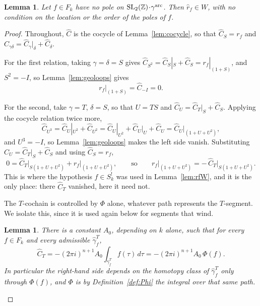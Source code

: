 \documentclass[11pt]{article}
\newtheorem{lemma}[theorem]{Lemma}
\newcommand{\ZZ}{\mathbb{Z}}
\newcommand{\SLZ}{\mathrm{SL}_2(\ZZ)}
\begin{document}
\begin{lemma}\label{lem:arcoff}
Let $f\in F_k$ have no pole on $\SLZ\!\cdot\!\gamma^{\rm arc}$. Then $\hat r_f\in W$, with no
condition on the location or the order of the poles of $f$.
\end{lemma}

\begin{proof}
Throughout, $\hat C$ is the cocycle of Lemma~\ref{lem:cocycle}, so that $\hat C_S=r_f$ and
$\hat C_{\gamma\delta}=\hat C_\gamma|_\delta+\hat C_\delta$.

For the first relation, taking $\gamma=\delta=S$ gives
$\hat C_{S^2}=\hat C_S|_S+\hat C_S=r_f|_{(1+S)}$, and $S^2=-I$, so
Lemma~\ref{lem:geoloops} gives
\begin{equation}\label{eq:arcoffS}
r_f\big|_{(1+S)}=\hat C_{-I}=0 .
\end{equation}

For the second, take $\gamma=T$, $\delta=S$, so that $U=TS$ and
$\hat C_U=\hat C_T|_S+\hat C_S$. Applying the cocycle relation twice more,
\begin{equation*}
\hat C_{U^3}=\hat C_U|_{U^2}+\hat C_{U^2}
=\hat C_U|_{U^2}+\hat C_U|_{U}+\hat C_U=\hat C_U\big|_{(1+U+U^2)} ,
\end{equation*}
and $U^3=-I$, so Lemma~\ref{lem:geoloops} makes the left side vanish. Substituting
$\hat C_U=\hat C_T|_S+\hat C_S$ and using $\hat C_S=r_f$,
\begin{equation}\label{eq:arcoffU}
0=\hat C_T\big|_{S(1+U+U^2)}+r_f\big|_{(1+U+U^2)},
\qquad\text{so}\qquad
r_f\big|_{(1+U+U^2)}=-\,\hat C_T\big|_{S(1+U+U^2)} .
\end{equation}
This is where the hypothesis $f\in S^!_k$ was used in Lemma~\ref{lem:rfW}, and it is the only
place: there $\hat C_T$ vanished, here it need not.

The $T$-cochain is controlled by $\Phi$ alone, whatever path represents the $T$-segment. We isolate
this, since it is used again below for segments that wind.

\begin{lemma}\label{lem:CTPhi}
There is a constant $A_0$, depending on $k$ alone, such that for every $f\in F_k$ and every
admissible $\hat\gamma^T_f$,
\begin{equation}\label{eq:arcoffCT}
\hat C_T=-(2\pi i)^{n+1}A_0\int_{\hat\gamma^T_f}f(\tau)\,d\tau=-(2\pi i)^{n+1}A_0\,\Phi(f).
\end{equation}
In particular the right-hand side depends on the homotopy class of $\hat\gamma^T_f$ only through
$\Phi(f)$, and $\Phi$ is by Definition~\ref{def:Phi} the integral over that same path.
\end{lemma}


\end{proof}
\end{document}
